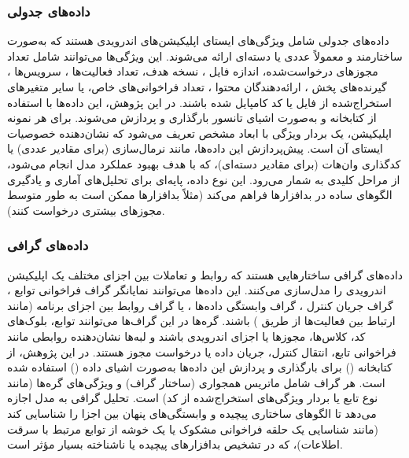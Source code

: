 \subsubsection{داده‌های جدولی}
داده‌های جدولی شامل ویژگی‌های ایستای اپلیکیشن‌های اندرویدی هستند که به‌صورت ساختارمند و معمولاً عددی یا دسته‌ای ارائه می‌شوند. این ویژگی‌ها می‌توانند شامل تعداد مجوزهای درخواست‌شده، اندازه فایل ، نسخه  هدف، تعداد فعالیت‌ها ، سرویس‌ها ، گیرنده‌های پخش ، ارائه‌دهندگان محتوا ، تعداد فراخوانی‌های  خاص، یا سایر متغیرهای استخراج‌شده از فایل  یا کد کامپایل شده باشند. در این پژوهش، این داده‌ها با استفاده از کتابخانه  و به‌صورت اشیای تانسور  بارگذاری و پردازش می‌شوند. برای هر نمونه اپلیکیشن، یک بردار ویژگی با ابعاد مشخص تعریف می‌شود که نشان‌دهنده خصوصیات ایستای آن است. پیش‌پردازش این داده‌ها، مانند نرمال‌سازی (برای مقادیر عددی) یا کدگذاری وان‌هات (برای مقادیر دسته‌ای)، که با هدف بهبود عملکرد مدل انجام می‌شود، از مراحل کلیدی به شمار می‌رود. این نوع داده، پایه‌ای برای تحلیل‌های آماری و یادگیری الگوهای ساده در بدافزارها فراهم می‌کند (مثلاً بدافزارها ممکن است به طور متوسط مجوزهای بیشتری درخواست کنند).

\subsubsection{داده‌های گرافی}
داده‌های گرافی ساختارهایی هستند که روابط و تعاملات بین اجزای مختلف یک اپلیکیشن اندرویدی را مدل‌سازی می‌کنند. این داده‌ها می‌توانند نمایانگر گراف فراخوانی توابع ، گراف جریان کنترل ، گراف وابستگی داده‌ها ، یا گراف روابط بین اجزای برنامه (مانند ارتباط بین فعالیت‌ها از طریق ) باشند. گره‌ها  در این گراف‌ها می‌توانند توابع، بلوک‌های کد، کلاس‌ها، مجوزها یا اجزای اندرویدی باشند و لبه‌ها نشان‌دهنده روابطی مانند فراخوانی تابع، انتقال کنترل، جریان داده یا درخواست مجوز هستند. در این پژوهش، از کتابخانه  () برای بارگذاری و پردازش این داده‌ها به‌صورت اشیای داده () استفاده شده است. هر گراف شامل ماتریس همجواری (ساختار گراف) و ویژگی‌های گره‌ها (مانند نوع تابع یا بردار ویژگی‌های استخراج‌شده از کد) است. تحلیل گرافی به مدل اجازه می‌دهد تا الگوهای ساختاری پیچیده و وابستگی‌های پنهان بین اجزا را شناسایی کند (مانند شناسایی یک حلقه فراخوانی مشکوک یا یک خوشه از توابع مرتبط با سرقت اطلاعات)، که در تشخیص بدافزارهای پیچیده یا ناشناخته بسیار مؤثر است.

